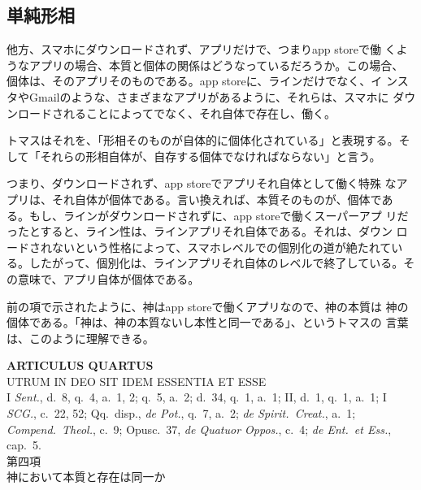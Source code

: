 \documentclass[paper=a4paper,fontsize=10pt,jafontsize=9pt,titlepage]{jlreq}
\begin{document}
\subsection{単純形相}
他方、スマホにダウンロードされず、アプリだけで、つまりapp storeで働
くようなアプリの場合、本質と個体の関係はどうなっているだろうか。この場合、
個体は、そのアプリそのものである。app storeに、ラインだけでなく、イ
ンスタやGmailのような、さまざまなアプリがあるように、それらは、スマホに
ダウンロードされることによってでなく、それ自体で存在し、働く。

トマスはそれを、「形相そのものが自体的に個体化されている」と表現する。そ
して「それらの形相自体が、自存する個体でなければならない」と言う。

つまり、ダウンロードされず、app storeでアプリそれ自体として働く特殊
なアプリは、それ自体が個体である。言い換えれば、本質そのものが、個体であ
る。もし、ラインがダウンロードされずに、app storeで働くスーパーアプ
リだったとすると、ライン性は、ラインアプリそれ自体である。それは、ダウン
ロードされないという性格によって、スマホレベルでの個別化の道が絶たれてい
る。したがって、個別化は、ラインアプリそれ自体のレベルで終了している。そ
の意味で、アプリ自体が個体である。

前の項で示されたように、神はapp storeで働くアプリなので、神の本質は
神の個体である。「神は、神の本質ないし本性と同一である」、というトマスの
言葉は、このように理解できる。



\newpage
{}

\begin{center}
 {\Large {\bfseries ARTICULUS QUARTUS}}\\
 {\large UTRUM IN DEO SIT IDEM ESSENTIA ET ESSE}\\
 {\footnotesize I \textit{Sent.}, d.~8, q.~4, a.~1, 2; q.~5, a.~2;
 d.~34, q.~1, a.~1; II, d.~1, q.~1, a.~1; I \textit{SCG.}, c.~22, 52;
 Qq.~disp., \textit{de Pot.}, q.~7, a.~2; \textit{de Spirit.~Creat.},
 a.~1; \textit{Compend.~Theol.}, c.~9; Opusc.~37, \textit{de Quatuor
 Oppos.}, c.~4; \textit{de Ent.~et Ess.}, cap.~5.}\\
{\Large 第四項\\神において本質と存在は同一か}
\end{center}
\end{document}

